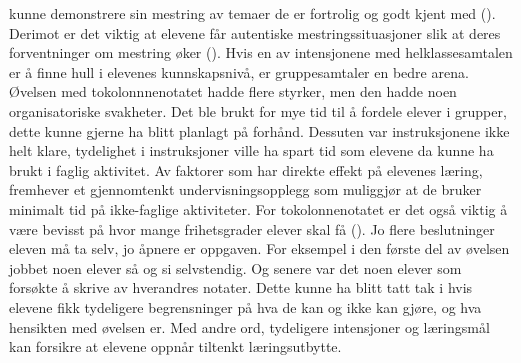 \documentclass[main.tex]{subfiles}
\begin{document}
kunne demonstrere sin mestring av temaer de er fortrolig og godt kjent med (). 
Derimot er det viktig at elevene får autentiske mestringssituasjoner slik at deres forventninger
om mestring øker (). Hvis en av intensjonene med helklassesamtalen er å 
finne hull i elevenes kunnskapsnivå, er gruppesamtaler en bedre arena.
\newline
\newline
Øvelsen med tokolonnnenotatet hadde flere styrker, men den hadde noen organisatoriske svakheter. 
Det ble brukt for mye tid til å fordele elever i grupper, dette kunne gjerne ha blitt planlagt på 
forhånd. Dessuten var instruksjonene ikke helt klare, tydelighet i instruksjoner ville ha spart tid 
som elevene da kunne ha brukt i faglig aktivitet. Av faktorer som har direkte effekt på elevenes 
læring, fremhever  et gjennomtenkt undervisningsopplegg som muliggjør at 
de bruker minimalt tid på ikke-faglige aktiviteter. For tokolonnenotatet er det også viktig å være 
bevisst på hvor mange frihetsgrader elever skal få (). Jo flere beslutninger eleven 
må ta selv, jo åpnere er oppgaven. For eksempel i den første del av øvelsen jobbet noen elever 
så og si selvstendig. Og senere var det noen elever som forsøkte å skrive av hverandres notater.
Dette kunne ha blitt tatt tak i hvis elevene fikk tydeligere begrensninger på hva de kan og ikke
kan gjøre, og hva hensikten med øvelsen er. Med andre ord, tydeligere intensjoner og læringsmål
kan forsikre at elevene oppnår tiltenkt læringsutbytte. 
\end{document}
